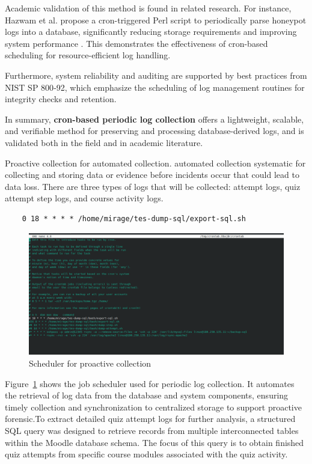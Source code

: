 Academic validation of this method is found in related research. For instance, Hazwam et al. propose a cron-triggered Perl script to periodically parse honeypot logs into a database, significantly reducing storage requirements and improving system performance \citet{halim2019honeypot}. This demonstrates the effectiveness of cron-based scheduling for resource-efficient log handling.

Furthermore, system reliability and auditing are supported by best practices from NIST SP 800‑92, which emphasize the scheduling of log management routines for integrity checks and retention.

In summary, \textbf{cron-based periodic log collection}  offers a lightweight, scalable, and verifiable method for preserving and processing database-derived logs, and is validated both in the field and in academic literature.

Proactive collection for automated collection. automated collection systematic for collecting and storing data or evidence before incidents occur that could lead to data loss. There are three types of logs that will be collected: attempt logs, quiz attempt step logs, and course activity logs.
\begin{verbatim}
	0 18 * * * * /home/mirage/tes-dump-sql/export-sql.sh
\end{verbatim}
\begin{figure}[H] 
	\centering
	\includegraphics[width=14cm]{figure/scheduler-crontab.png}
	\caption{Scheduler for proactive collection}
	\label{fig:scheduler}
\end{figure}


Figure~\ref{fig:scheduler} shows the job scheduler used for periodic log collection. It automates the retrieval of log data from the database and system components, ensuring timely collection and synchronization to centralized storage to support proactive forensic.To extract detailed quiz attempt logs for further analysis, a structured SQL query was designed to retrieve records from multiple interconnected tables within the Moodle database schema. The focus of this query is to obtain finished quiz attempts from specific course modules associated with the quiz activity.

